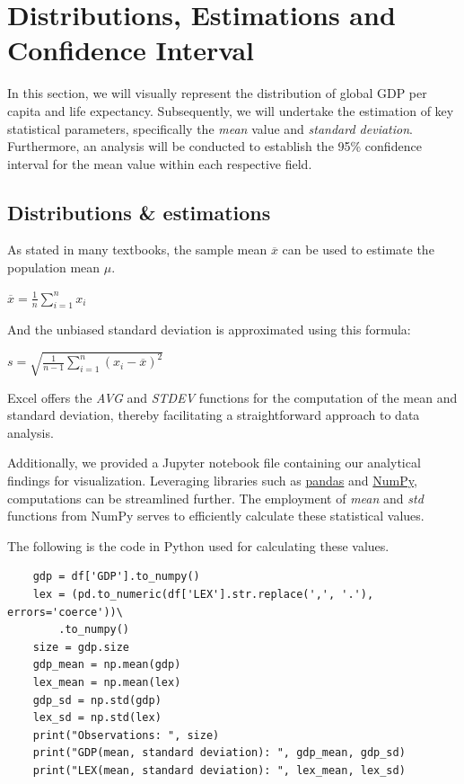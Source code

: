 %
\renewcommand{\chaptername}{Part}
\chapter{Distributions, Estimations and Confidence Interval}
\label{part1}
In this section, we will visually represent the distribution of global GDP per capita and life expectancy. Subsequently, we will undertake the estimation of key statistical parameters, specifically the \textit{mean} value and \textit{standard deviation}. Furthermore, an analysis will be conducted to establish the 95\% confidence interval for the mean value within each respective field.
\section{Distributions \& estimations}
As stated in many textbooks, the sample mean $\overline{x}$ can be used to estimate the population mean $\mu$.
\begin{center}
    {\fontsize{16}{20}\selectfont $\overline{x} = \frac{1}{n} \sum_{i = 1}^{n} x_i$}
\end{center}

And the unbiased standard deviation is approximated using this formula:
\begin{center}
{\fontsize{16}{20}\selectfont$s = \sqrt{\frac{1}{n-1}\sum_{i=1}^n (x_i - \overline{x})^2} $}
\end{center}

Excel offers the \textit{AVG} and \textit{STDEV} functions for the computation of the mean and standard deviation, thereby facilitating a straightforward approach to data analysis.

Additionally, we provided a Jupyter notebook file containing our analytical findings for visualization. Leveraging libraries such as \href{https://pandas.pydata.org/}{pandas} and \href{https://numpy.org/}{NumPy}, computations can be streamlined further. The employment of \textit{mean} and \textit{std} functions from NumPy serves to efficiently calculate these statistical values.

The following is the code in Python used for calculating these values.
\newpage
\begin{verbatim}
    gdp = df['GDP'].to_numpy()
    lex = (pd.to_numeric(df['LEX'].str.replace(',', '.'), errors='coerce'))\
        .to_numpy()
    size = gdp.size
    gdp_mean = np.mean(gdp)
    lex_mean = np.mean(lex)
    gdp_sd = np.std(gdp)
    lex_sd = np.std(lex)
    print("Observations: ", size)
    print("GDP(mean, standard deviation): ", gdp_mean, gdp_sd)
    print("LEX(mean, standard deviation): ", lex_mean, lex_sd)
\end{verbatim}

